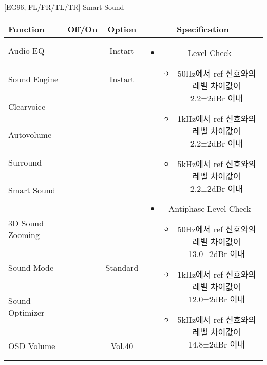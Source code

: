 \begin{frame}[t]{[EG96, FL/FR/TL/TR] Smart Sound}
\begin{tiny}
\begin{tabular}{@{}lccc@{}}
\toprule
Function & Off/On & Option & Specification \\
\midrule
Audio EQ & \color{black}{Off} & Instart &
\multirow{10}{60mm}{
\begin{itemize}
\item Level Check
	\begin{itemize}
	\item 50Hz에서 ref 신호와의 레벨 차이값이 2.2±2dBr 이내
	\item 1kHz에서 ref 신호와의 레벨 차이값이 2.2±2dBr 이내
	\item 5kHz에서 ref 신호와의 레벨 차이값이 2.2±2dBr 이내
	\end{itemize}
\item Antiphase Level Check
	\begin{itemize}	
	\item 50Hz에서 ref 신호와의 레벨 차이값이 13.0±2dBr 이내
	\item 1kHz에서 ref 신호와의 레벨 차이값이 12.0±2dBr 이내
	\item 5kHz에서 ref 신호와의 레벨 차이값이 14.8±2dBr 이내
	\end{itemize}
\end{itemize}
} \\
Sound Engine & \color{blue}{On} & Instart & \\
Clearvoice & \color{black}{Off} & & \\
Autovolume & \color{black}{Off} & & \\
Surround & \color{black}{Off} & & \\
Smart Sound & \color{blue}{On} & & \\
3D Sound Zooming & \color{black}{Off} & & \\
Sound Mode & \color{blue}{On} & Standard & \\
Sound Optimizer & \color{black}{Off} & & \\
OSD Volume & \color{blue}{On} & Vol.40 & \\
\midrule
\end{tabular}
\end{tiny}

\end{frame}


